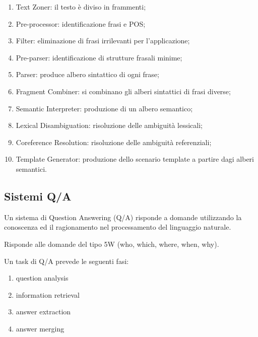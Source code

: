 \begin{enumerate}

	\item Text Zoner: il testo è diviso in frammenti;
	
	\item Pre-processor: identificazione frasi e POS;
	
	\item Filter: eliminazione di frasi irrilevanti per l'applicazione;
	
	\item Pre-parser: identificazione di strutture frasali minime;
	
	\item Parser: produce albero sintattico di ogni frase;
	
	\item Fragment Combiner: si combinano gli alberi sintattici di frasi diverse;
	
	\item Semantic Interpreter: produzione di un albero semantico;
	
	\item Lexical Disambiguation: risoluzione delle ambiguità lessicali;
	
	\item Coreference Resolution: risoluzione delle ambiguità referenziali;
	
	\item Template Generator: produzione dello scenario  template a partire dagi alberi semantici.
	
\end{enumerate}


\subsection{Sistemi Q/A}
Un sistema di Question Answering (Q/A) risponde a domande utilizzando la conoscenza ed il ragionamento nel processamento del linguaggio naturale.

Risponde alle domande del tipo 5W (who, which, where, when, why).

Un task di Q/A prevede le seguenti fasi:

\begin{enumerate}

	\item question analysis
	
	\item information retrieval
	
	\item answer extraction
	
	\item answer merging
	
\end{enumerate}


